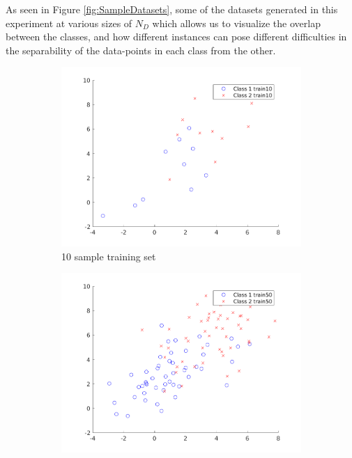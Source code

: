 As seen in Figure \ref{fig:SampleDatasets}, some of the datasets generated in this experiment at various sizes of $N_{D}$ which allows us to visualize the overlap between the classes, and how different instances can pose different difficulties in the separability of the data-points in each class from the other.

\begin{figure}[H]
        \centering
        \begin{subfigure}[b]{0.475\textwidth}
            \centering
            \includegraphics[width=\textwidth]{./code/Exp1-results/10iters/Train10.png}
            \caption[]%
            {{\small 10 sample training set}}    
            \label{fig:train10}
        \end{subfigure}
        \hfill
        \begin{subfigure}[b]{0.475\textwidth}  
            \centering 
            \includegraphics[width=\textwidth]{./code/Exp1-results/10iters/Train50.png}

\end{subfigure}
\end{figure}
